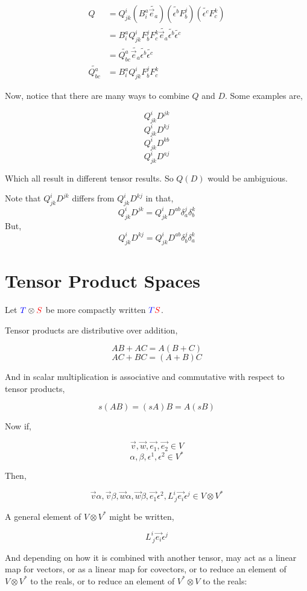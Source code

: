 \documentclass[12pt]{book}
\theoremstyle{plain}
\theoremstyle{definition}
\theoremstyle{ppart}
\theoremstyle{case}
\theoremstyle{solution}
\begin{document}
\begin{align*}
  Q &= Q^i_{jk} (B^a_i \widetilde{\vec{e}_a}) (\widetilde{\epsilon^b} F^j_b) (\widetilde{\epsilon^c} F^k_c) \\
  &= B^a_i Q^i_{jk} F^j_b F^k_c \widetilde{\vec{e}_a} \widetilde{\epsilon^b} \widetilde{\epsilon^c} \\
  &= \widetilde{Q^a_{bc}} \widetilde{\vec{e}_a} \widetilde{\epsilon^b} \widetilde{\epsilon^c} \\
  \widetilde{Q^a_{bc}} &= B^a_i Q^i_{jk} F^j_b F^k_c
\end{align*}

Now, notice that there are many ways to combine $Q$ and $D$. Some examples are,

\[ Q^i_{jk} D^{jk} \]
\[ Q^i_{jk} D^{kj} \]
\[ Q^i_{jk} D^{kb} \]
\[ Q^i_{jk} D^{aj} \]

Which all result in different tensor results. So $Q(D)$ would be ambiguious.

Note that $Q^i_{jk} D^{jk}$ differs from $Q^i_{jk} D^{kj}$  in that,
\[ Q^i_{jk} D^{jk} = Q^i_{jk} D^{ab} \delta^j_a \delta^k_b \]
But,
\[ Q^i_{jk} D^{kj} = Q^i_{jk} D^{ab} \delta^j_b \delta^k_a \]

\section{Tensor Product Spaces}

Let ${\color{blue}T} \otimes {\color{red}S}$ be more compactly written ${\color{blue}T}{\color{red}S}$.

Tensor products are distributive over addition,

\[ AB + AC = A(B+C) \]
\[ AC + BC = (A+B)C \]

And in scalar multiplication is associative and commutative with respect to tensor products,

\[ s(AB) = (sA)B = A(sB) \]

Now if,

\[ \vec{v}, \vec{w}, \vec{e_1}, \vec{e_2} \in V \]
\[ \alpha, \beta, \epsilon^1, \epsilon^2 \in V^* \]

Then,

\[ \vec{v} \alpha, \vec{v} \beta, \vec{w} \alpha, \vec{w} \beta, \vec{e_1} \epsilon^2, L^i_{~j} \vec{e_i} \epsilon^j \in V \otimes V^* \]

A general element of $V \otimes V^*$ might be written,

\[ L^i_{~j} \vec{e_i} \epsilon^j \]

And depending on how it is combined with another tensor, may act as a linear map for vectors, or as a linear map for covectors,
or to reduce an element of $V \otimes V^*$ to the reals, or to reduce an element of $V^* \otimes V$ to the reals:
\end{document}
